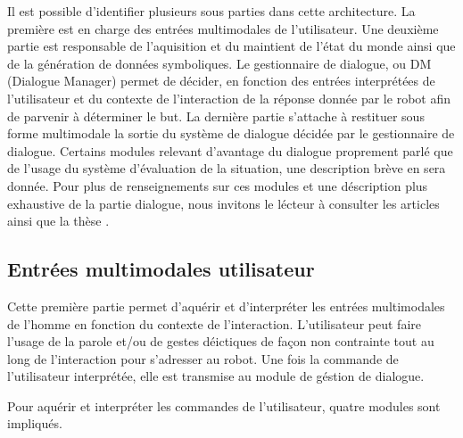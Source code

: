 \documentclass[a4paper,11pt,twoside]{StyleThese}
\begin{document}
Il est possible d'identifier plusieurs sous parties dans cette architecture.
La première est en charge des entrées multimodales de l'utilisateur. Une deuxième partie est responsable de l'aquisition et du maintient de l'état du monde ainsi que de la génération de données symboliques. Le gestionnaire de dialogue, ou DM (Dialogue Manager) permet de décider, en fonction des entrées interprétées de l'utilisateur et du contexte de l'interaction de la réponse donnée par le robot afin de parvenir à déterminer le but.
La dernière partie s'attache à restituer sous forme multimodale la sortie du système de dialogue décidée par le gestionnaire de dialogue.
Certains modules relevant d'avantage du dialogue proprement parlé que de l'usage du système d'évaluation de la situation, une description brève en sera donnée. Pour plus de renseignements sur ces modules et une déscription plus exhaustive de la partie dialogue, nous invitons le lécteur à consulter les articles \cite{Ferreira13a,Ferreira13b} ainsi que la thèse \cite{ferreira2015phd}.

\subsection{Entrées multimodales utilisateur}
\label{sec:entréesDial}
Cette première partie permet d'aquérir et d'interpréter les entrées multimodales de l'homme en fonction du contexte de l'interaction. L’utilisateur peut faire l’usage de la parole et/ou de gestes déictiques de façon non contrainte tout au long de l’interaction pour s’adresser au robot. Une fois la commande de l'utilisateur interprétée, elle est transmise au module de géstion de dialogue. 

Pour aquérir et interpréter les commandes de l'utilisateur, quatre modules sont impliqués.
\end{document}
